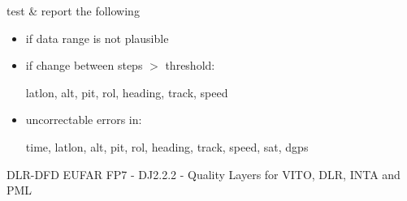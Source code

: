 %
{ %
test \& report the following
\begin{itemize}
\item if data range is not plausible
\item if change between steps $>$ threshold: 

latlon, alt, pit, rol, heading, track, speed

\item uncorrectable errors in:

time, latlon, alt, pit, rol, heading, track, speed, sat, dgps
\end{itemize}
}
%
{ %
DLR-DFD
}
%
{ %
EUFAR FP7 - DJ2.2.2 - Quality Layers for VITO, DLR, INTA and PML
}


